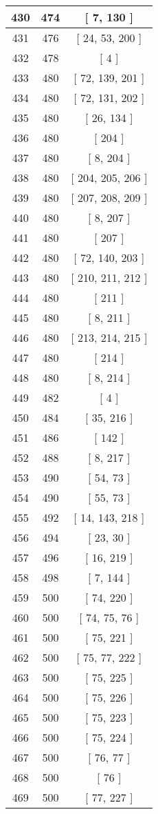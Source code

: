 \begin{center}
\begin{longtable}[H]{|| c c c ||}
\hline
430 & 474 & [ 7, 130 ] \\ 
\hline
431 & 476 & [ 24, 53, 200 ] \\ 
\hline
432 & 478 & [ 4 ] \\ 
\hline
433 & 480 & [ 72, 139, 201 ] \\ 
\hline
434 & 480 & [ 72, 131, 202 ] \\ 
\hline
435 & 480 & [ 26, 134 ] \\ 
\hline
436 & 480 & [ 204 ] \\ 
\hline
437 & 480 & [ 8, 204 ] \\ 
\hline
438 & 480 & [ 204, 205, 206 ] \\ 
\hline
439 & 480 & [ 207, 208, 209 ] \\ 
\hline
440 & 480 & [ 8, 207 ] \\ 
\hline
441 & 480 & [ 207 ] \\ 
\hline
442 & 480 & [ 72, 140, 203 ] \\ 
\hline
443 & 480 & [ 210, 211, 212 ] \\ 
\hline
444 & 480 & [ 211 ] \\ 
\hline
445 & 480 & [ 8, 211 ] \\ 
\hline
446 & 480 & [ 213, 214, 215 ] \\ 
\hline
447 & 480 & [ 214 ] \\ 
\hline
448 & 480 & [ 8, 214 ] \\ 
\hline
449 & 482 & [ 4 ] \\ 
\hline
450 & 484 & [ 35, 216 ] \\ 
\hline
451 & 486 & [ 142 ] \\ 
\hline
452 & 488 & [ 8, 217 ] \\ 
\hline
453 & 490 & [ 54, 73 ] \\ 
\hline
454 & 490 & [ 55, 73 ] \\ 
\hline
455 & 492 & [ 14, 143, 218 ] \\ 
\hline
456 & 494 & [ 23, 30 ] \\ 
\hline
457 & 496 & [ 16, 219 ] \\ 
\hline
458 & 498 & [ 7, 144 ] \\ 
\hline
459 & 500 & [ 74, 220 ] \\ 
\hline
460 & 500 & [ 74, 75, 76 ] \\ 
\hline
461 & 500 & [ 75, 221 ] \\ 
\hline
462 & 500 & [ 75, 77, 222 ] \\ 
\hline
463 & 500 & [ 75, 225 ] \\ 
\hline
464 & 500 & [ 75, 226 ] \\ 
\hline
465 & 500 & [ 75, 223 ] \\ 
\hline
466 & 500 & [ 75, 224 ] \\ 
\hline
467 & 500 & [ 76, 77 ] \\ 
\hline
468 & 500 & [ 76 ] \\ 
\hline
469 & 500 & [ 77, 227 ] \\ 
\hline
\end{longtable}
\end{center}
